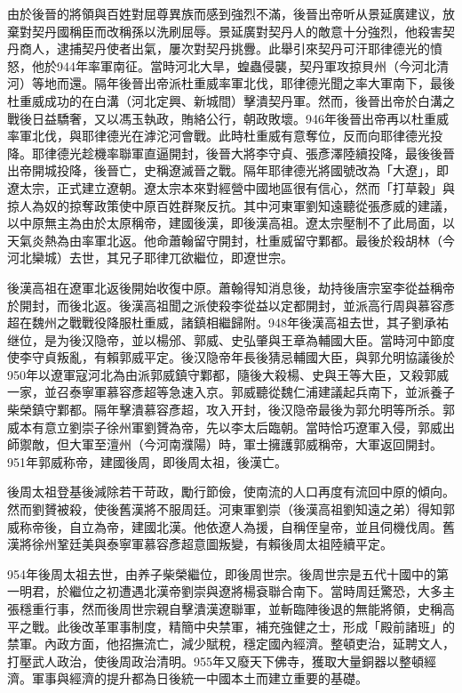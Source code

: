 由於後晉的將領與百姓對屈尊異族而感到強烈不滿，後晉出帝听从景延廣建议，放棄對契丹國稱臣而改稱孫以洗刷屈辱。景延廣對契丹人的敵意十分強烈，他殺害契丹商人，逮捕契丹使者出氣，屢次對契丹挑釁。此舉引來契丹可汗耶律德光的憤怒，他於944年率軍南征。當時河北大旱，蝗蟲侵襲，契丹軍攻掠貝州（今河北清河）等地而還。隔年後晉出帝派杜重威率軍北伐，耶律德光聞之率大軍南下，最後杜重威成功的在白溝（河北定興、新城間）擊潰契丹軍。然而，後晉出帝於白溝之戰後日益驕奢，又以馮玉執政，賄絡公行，朝政敗壞。946年後晉出帝再以杜重威率軍北伐，與耶律德光在滹沱河會戰。此時杜重威有意奪位，反而向耶律德光投降。耶律德光趁機率聯軍直逼開封，後晉大將李守貞、張彥澤陸續投降，最後後晉出帝開城投降，後晉亡，史稱遼滅晉之戰。隔年耶律德光將國號改為「大遼」，即遼太宗，正式建立遼朝。遼太宗本來對經營中國地區很有信心，然而「打草穀」與掠人為奴的掠奪政策使中原百姓群聚反抗。其中河東軍劉知遠聽從張彥威的建議，以中原無主為由於太原稱帝，建國後漢，即後漢高祖。遼太宗壓制不了此局面，以天氣炎熱為由率軍北返。他命蕭翰留守開封，杜重威留守鄴都。最後於殺胡林（今河北欒城）去世，其兄子耶律兀欲繼位，即遼世宗。

後漢高祖在遼軍北返後開始收復中原。蕭翰得知消息後，劫持後唐宗室李從益稱帝於開封，而後北返。後漢高祖聞之派使殺李從益以定都開封，並派高行周與慕容彥超在魏州之戰戰役降服杜重威，諸鎮相繼歸附。948年後漢高祖去世，其子劉承祐继位，是为後汉隐帝，並以楊邠、郭威、史弘肇與王章為輔國大臣。當時河中節度使李守貞叛亂，有賴郭威平定。後汉隐帝年長後猜忌輔國大臣，與郭允明協議後於950年以遼軍寇河北為由派郭威鎮守鄴都，隨後大殺楊、史與王等大臣，又殺郭威一家，並召泰寧軍慕容彥超等急速入京。郭威聽從魏仁浦建議起兵南下，並派養子柴榮鎮守鄴都。隔年擊潰慕容彥超，攻入开封，後汉隐帝最後为郭允明等所杀。郭威本有意立劉崇子徐州軍劉贇為帝，先以李太后臨朝。當時恰巧遼軍入侵，郭威出師禦敵，但大軍至澶州（今河南濮陽）時，軍士擁護郭威稱帝，大軍返回開封。951年郭威称帝，建國後周，即後周太祖，後漢亡。

後周太祖登基後減除若干苛政，勵行節儉，使南流的人口再度有流回中原的傾向。然而劉贇被殺，使後舊漢將不服周廷。河東軍劉崇（後漢高祖劉知遠之弟）得知郭威称帝後，自立為帝，建國北漢。他依遼人為援，自稱侄皇帝，並且伺機伐周。舊漢將徐州鞏廷美與泰寧軍慕容彥超意圖叛變，有賴後周太祖陸續平定。

954年後周太祖去世，由养子柴榮繼位，即後周世宗。後周世宗是五代十國中的第一明君，於繼位之初遭遇北漢帝劉崇與遼將楊袞聯合南下。當時周廷驚恐，大多主張穩重行事，然而後周世宗親自擊潰漢遼聯軍，並斬臨陣後退的無能將領，史稱高平之戰。此後改革軍事制度，精簡中央禁軍，補充強健之士，形成「殿前諸班」的禁軍。內政方面，他招撫流亡，減少賦稅，穩定國內經濟。整頓吏治，延聘文人，打壓武人政治，使後周政治清明。955年又廢天下佛寺，獲取大量銅器以整頓經濟。軍事與經濟的提升都為日後統一中國本土而建立重要的基礎。

